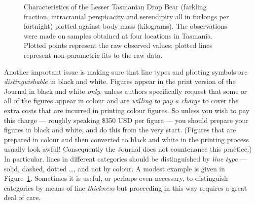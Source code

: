 \documentclass[
doublespace,
  times]{anzsauth}
\begin{document}
\begin{figure}


\caption{\label{fig-ltdb}Characteristics of the Lesser Tasmanian Drop
Bear (farkling fraction, intracranial perspicacity and serendipity all
in furlongs per fortnight) plotted against body mass (kilograms). The
observations were made on samples obtained at four locations in
Tasmania. Plotted points represent the raw observed values; plotted
lines represent non-parametric fits to the raw data.}

\end{figure}%

Another important issue is making sure that line types and plotting
symbols are \emph{distinguishable} in black and white. Figures appear in
the print version of the Journal in black and white \emph{only}, unless
authors specifically request that some or all of the figures appear in
colour and are \emph{willing to pay a charge} to cover the extra costs
that are incurred in printing colour figures. So unless you wish to pay
this charge --- roughly speaking \$350 USD per figure --- you should
prepare your figures in black and white, and do this from the very
start. (Figures that are prepared in colour and then converted to black
and white in the printing process usually look awful! Consequently the
Journal does not countenance this practice.) In particular, lines in
different categories should be distinguished by \emph{line type} ---
solid, dashed, dotted \ldots, and not by colour. A modest example is
given in Figure~\ref{fig-ltdb}. Sometimes it is useful, or perhaps even
necessary, to distinguish categories by means of line \emph{thickness}
but proceeding in this way requires a great deal of care.
\end{document}
